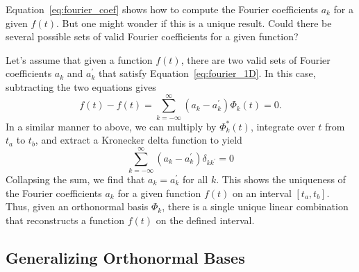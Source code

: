Equation~\ref{eq:fourier_coef} shows how to compute the Fourier coefficients
$a_k$ for a given $f(t)$.  But one might wonder if this is a unique result.
Could there be several possible sets of valid Fourier coefficients for
a given function?

Let's assume that given a function $f(t)$, there are two valid sets of
Fourier coefficients $a_k$ and $a^\prime_k$ that satisfy
Equation~\ref{eq:fourier_1D}.  In this case, subtracting the two equations
gives
\begin{equation}
  f(t) - f(t) = \sum_{k=-\infty}^\infty (a_k - a^\prime_k)\Phi_k(t) = 0.
\end{equation}
In a similar manner to above, we can multiply by $\Phi^\ast_k(t)$, integrate
over $t$ from $t_a$ to $t_b$, and extract a Kronecker delta function to
yield
\begin{equation}
  \sum_{k=-\infty}^\infty (a_k - a^\prime_k) \delta_{kk^\prime} = 0
\end{equation}
Collapsing the sum, we find that $a_k = a^\prime_k$ for all $k$.  This
shows the uniqueness of the Fourier coefficients $a_k$ for a given function
$f(t)$ on an interval $[t_a, t_b]$.  Thus, given an orthonormal basis $\Phi_k$,
there is a single unique linear combination that reconstructs a function
$f(t)$ on the defined interval.

\subsection{Generalizing Orthonormal Bases}

